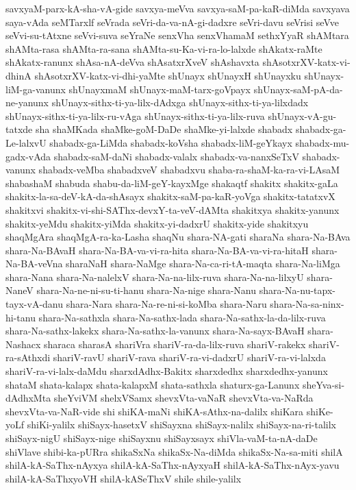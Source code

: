 {savxyaM-parx-kA-sha-vA-gide
savxya-meVva
savxya-saM-pa-kaR-diMda
savxyava
saya-vAda
seMTarxlf
seVrada
seVri-da-va-nA-gi-dadxre
seVri-davu
seVrisi
seVve
seVvi-su-tAtxne
seVvi-suva
seYraNe
senxVha
senxVhamaM
sethxYyaR
shAMtara
shAMta-rasa
shAMta-ra-sana
shAMta-su-Ka-vi-ra-lo-lalxde
shAkatx-raMte
shAkatx-ranunx
shAsa-nA-deVva
shAsatxrXveV
shAshavxta
shAsotxrXV-katx-vi-dhinA
shAsotxrXV-katx-vi-dhi-yaMte
shUnayx
shUnayxH
shUnayxku
shUnayx-liM-ga-vanunx
shUnayxmaM
shUnayx-maM-tarx-goVpayx
shUnayx-saM-pA-da-ne-yanunx
shUnayx-sithx-ti-ya-lilx-dAdxga
shUnayx-sithx-ti-ya-lilxdadx
shUnayx-sithx-ti-ya-lilx-ru-vAga
shUnayx-sithx-ti-ya-lilx-ruva
shUnayx-vA-gu-tatxde
sha
shaMKada
shaMke-goM-DaDe
shaMke-yi-lalxde
shabadx
shabadx-ga-Le-lalxvU
shabadx-ga-LiMda
shabadx-koVsha
shabadx-liM-geYkayx
shabadx-mu-gadx-vAda
shabadx-saM-daNi
shabadx-valalx
shabadx-va-nanxSeTxV
shabadx-vanunx
shabadx-veMba
shabadxveV
shabadxvu
shaba-ra-shaM-ka-ra-vi-LAsaM
shabashaM
shabuda
shabu-da-liM-geY-kayxMge
shakaqtf
shakitx
shakitx-gaLa
shakitx-la-sa-deV-kA-da-shAsayx
shakitx-saM-pa-kaR-yoVga
shakitx-tatatxvX
shakitxvi
shakitx-vi-shi-SAThx-devxY-ta-veV-dAMta
shakitxya
shakitx-yanunx
shakitx-yeMdu
shakitx-yiMda
shakitx-yi-dadxrU
shakitx-yide
shakitxyu
shaqMgAra
shaqMgA-ra-ka-Lasha
shaqNu
shara-NA-gati
sharaNa
shara-Na-BAva
shara-Na-BAvaH
shara-Na-BA-va-vi-ra-hita
shara-Na-BA-va-vi-ra-hitaH
shara-Na-BA-veVna
sharaNaH
shara-NaMge
shara-Na-ca-ri-tA-maqta
shara-Na-liMga
shara-Nana
shara-Na-nalelxV
shara-Na-na-lilx-ruva
shara-Na-na-lilxyU
shara-NaneV
shara-Na-ne-ni-su-ti-hanu
shara-Na-nige
shara-Nanu
shara-Na-nu-tapx-tayx-vA-danu
shara-Nara
shara-Na-re-ni-si-koMba
shara-Naru
shara-Na-sa-ninx-hi-tanu
shara-Na-sathxla
shara-Na-sathx-lada
shara-Na-sathx-la-da-lilx-ruva
shara-Na-sathx-lakekx
shara-Na-sathx-la-vanunx
shara-Na-sayx-BAvaH
shara-Nashacx
sharaca
sharasA
shariVra
shariV-ra-da-lilx-ruva
shariV-rakekx
shariV-ra-sAthxdi
shariV-ravU
shariV-rava
shariV-ra-vi-dadxrU
shariV-ra-vi-lalxda
shariV-ra-vi-lalx-daMdu
sharxdAdhx-Bakitx
sharxdedhx
sharxdedhx-yanunx
shataM
shata-kalapx
shata-kalapxM
shata-sathxla
shaturx-ga-Lanunx
sheYva-si-dAdhxMta
sheYviVM
shelxVSamx
shevxVta-vaNaR
shevxVta-va-NaRda
shevxVta-va-NaR-vide
shi
shiKA-maNi
shiKA-sAthx-na-dalilx
shiKara
shiKe-yoLf
shiKi-yalilx
shiSayx-hasetxV
shiSayxna
shiSayx-nalilx
shiSayx-na-ri-talilx
shiSayx-nigU
shiSayx-nige
shiSayxnu
shiSayxsayx
shiVla-vaM-ta-nA-daDe
shiVlave
shibi-ka-pURra
shikaSxNa
shikaSx-Na-diMda
shikaSx-Na-sa-miti
shilA
shilA-kA-SaThx-nAyxya
shilA-kA-SaThx-nAyxyaH
shilA-kA-SaThx-nAyx-yavu
shilA-kA-SaThxyoVH
shilA-kASeThxV
shile
shile-yalilx
}
